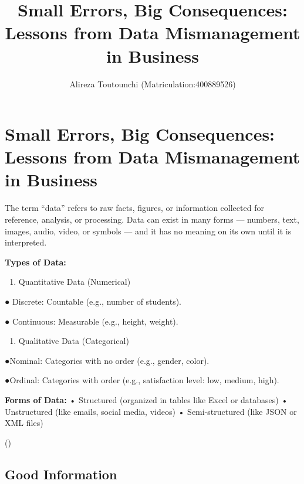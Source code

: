 \documentclass[
  man,
  floatsintext,
  longtable,
  nolmodern,
  notxfonts,
  notimes,
  colorlinks=true,linkcolor=blue,citecolor=blue,urlcolor=blue]{apa7}
\title{Small Errors, Big Consequences: Lessons from Data Mismanagement
in Business}
\author{Alireza Toutounchi (Matriculation:400889526)}
\affiliation{
{Hochschule Fresenius - University of Applied Science}}
\providecommand{\tightlist}{%
  \setlength{\itemsep}{0pt}\setlength{\parskip}{0pt}}
\begin{document}
\maketitle

\hypertarget{toc}{}
\tableofcontents
\newpage
\section[Introduction]{Small Errors, Big Consequences: Lessons from Data
Mismanagement in Business}

\setcounter{secnumdepth}{-\maxdimen} %

\setlength\LTleft{0pt}


The term ``data'' refers to raw facts, figures, or information collected
for reference, analysis, or processing. Data can exist in many forms ---
numbers, text, images, audio, video, or symbols --- and it has no
meaning on its own until it is interpreted.

\textbf{Types of Data:}

\begin{enumerate}
\def\labelenumi{\arabic{enumi}.}
\tightlist
\item
  Quantitative Data (Numerical)
\end{enumerate}

● Discrete: Countable (e.g., number of students).

● Continuous: Measurable (e.g., height, weight).

\begin{enumerate}
\def\labelenumi{\arabic{enumi}.}
\setcounter{enumi}{1}
\tightlist
\item
  Qualitative Data (Categorical)
\end{enumerate}

●Nominal: Categories with no order (e.g., gender, color).

●Ordinal: Categories with order (e.g., satisfaction level: low, medium,
high).

\textbf{Forms of Data:} • Structured (organized in tables like Excel or
databases) • Unstructured (like emails, social media, videos) •
Semi-structured (like JSON or XML files)

()

\subsection{Good Information}\label{good-information}
\end{document}
